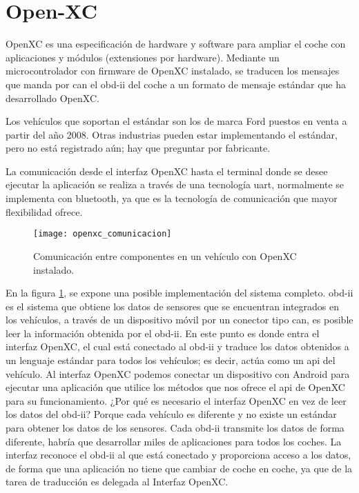 \section{Open-XC}\label{apendice:open-xc}
OpenXC es una especificación de hardware y software para ampliar el coche con
aplicaciones y módulos (extensiones por hardware). Mediante un microcontrolador
con firmware de OpenXC instalado, se traducen los mensajes que manda por
\gls{can} el \Gls{obd-ii} del coche a un formato de mensaje estándar que ha
desarrollado OpenXC.

Los vehículos que soportan el estándar son los de marca Ford puestos
en venta a partir del año 2008. Otras industrias pueden estar implementando el
estándar, pero no está registrado aún; hay que preguntar por fabricante.

La comunicación desde el interfaz OpenXC hasta el terminal donde se desee
ejecutar la aplicación se realiza a través de una tecnología \gls{uart},
normalmente se implementa con bluetooth, ya que es la tecnología de comunicación
que mayor flexibilidad ofrece.

\begin{figure}[H]
	\begin{center}
		\texttt{[image: openxc\_comunicacion]}
		\caption{Comunicación entre componentes en un vehículo con OpenXC instalado.}
		\label{fig:openxc_comunicacion}
	\end{center}
\end{figure}


En la figura \ref{fig:openxc_comunicacion}, se expone una posible
implementación del sistema completo. \Gls{obd-ii} es el sistema que obtiene los
datos de sensores que se encuentran integrados en los vehículos, a través de un
dispositivo móvil por un conector tipo \gls{can}, es posible leer la información
obtenida por el \Gls{obd-ii}. En este punto es donde entra el interfaz OpenXC,
el cual está conectado al \Gls{obd-ii} y traduce los datos obtenidos a un
lenguaje estándar para todos los vehículos; es decir, actúa como un \gls{api}
del vehículo. Al interfaz OpenXC podemos conectar un dispositivo con Android
para ejecutar una aplicación que utilice los métodos que nos ofrece el \gls{api}
de OpenXC para su funcionamiento. ¿Por qué es necesario el interfaz OpenXC en
vez de leer los datos del \Gls{obd-ii}? Porque cada vehículo es diferente y no
existe un estándar para obtener los datos de los sensores. Cada \Gls{obd-ii}
transmite los datos de forma diferente, habría que desarrollar miles de
aplicaciones para todos los coches. La interfaz reconoce el \Gls{obd-ii} al que
está conectado y proporciona acceso a los datos, de forma que una aplicación no
tiene que cambiar de coche en coche, ya que de la tarea de traducción es
delegada al Interfaz OpenXC.


